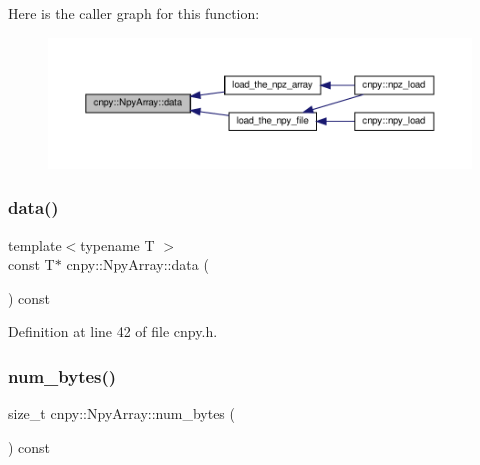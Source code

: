 Here is the caller graph for this function\+:
\nopagebreak
\begin{figure}[H]
\begin{center}
\leavevmode
\includegraphics[width=350pt]{structcnpy_1_1_npy_array_a367b7feaf166b62930cc6ce1c4426fc4_icgraph}
\end{center}
\end{figure}
\mbox{\label{structcnpy_1_1_npy_array_a1622cd2863fb3f238c2b777a74d5a4e2}} 
\subsubsection{\texorpdfstring{data()}{data()}\hspace{0.1cm}{\footnotesize\ttfamily [2/2]}}
{\footnotesize\ttfamily template$<$typename T $>$ \\
const T$\ast$ cnpy\+::\+Npy\+Array\+::data (\begin{DoxyParamCaption}{ }\end{DoxyParamCaption}) const\hspace{0.3cm}{\ttfamily [inline]}}



Definition at line 42 of file cnpy.\+h.

\mbox{\label{structcnpy_1_1_npy_array_ae8004f74b07e6148d7342c2d063e12fc}} 
\subsubsection{\texorpdfstring{num\+\_\+bytes()}{num\_bytes()}}
{\footnotesize\ttfamily size\+\_\+t cnpy\+::\+Npy\+Array\+::num\+\_\+bytes (\begin{DoxyParamCaption}{ }\end{DoxyParamCaption}) const\hspace{0.3cm}{\ttfamily [inline]}}



